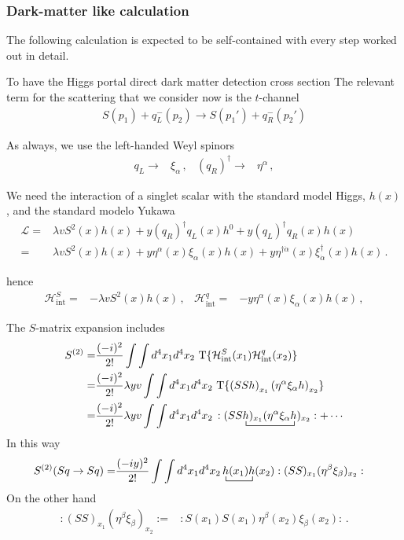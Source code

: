 \subsubsection{Dark-matter like calculation}

The following calculation is expected to be self-contained with every step worked out in detail.

To have the Higgs portal direct dark matter detection cross section
The relevant term for the scattering that we consider now is the $t$-channel
\begin{align}
  S(p_1)+q_L^{-}(p_2)\to  S(p_1')+q_R^{-}(p_2')
\end{align}

As always, we use the left-handed Weyl spinors
\begin{align}
  q_L\to &\xi_{\alpha}\,, &   \left( q_R \right)^{\dagger}\to &\eta^{\alpha}\,,
\end{align}


We need the interaction of a singlet scalar with the standard model Higgs, $h(x)$, and the standard modelo Yukawa
\begin{align}
  \mathcal{L}=&\lambda v S^2(x) h(x)+y \left(q_R\right)^{\dagger} q_L(x) h^0 +y \left(q_L\right)^{\dagger} q_R(x) h(x) \nonumber\\
  =&\lambda v S^2(x) h(x)+y \eta^{\alpha} (x)\xi_{\alpha}(x)h(x) + y \eta^{\dagger\dot{\alpha}}(x) \xi_{\dot{\alpha}}^{\dagger}(x)h(x)\,. 
\end{align}

hence
\begin{align}
  \mathcal{H}_{\text{int}}^{S}=&-\lambda v S^2(x) h(x)\,, &
   \mathcal{H}_{\text{int}}^{q}=&-y \eta^{\alpha} (x)\xi_{\alpha}(x)h(x)\,,
\end{align}

The $S$-matrix expansion includes
\begin{align}
S^{(2)}=&  \frac{(-i)^2}{2!}\int\int d^4x_1 d^4x_2\,\operatorname{T}\{\mathcal{H}_{\text{int}}^S(x_1)\mathcal{H}_{\text{int}}^q(x_2)\}\nonumber\\
=&  \frac{(-i)^2}{2!}\lambda y v\int\int d^4x_1 d^4x_2\,\operatorname{T}\{\left(S S h \right)_{x_1} \left( \eta^{\alpha} \xi_{\alpha}h \right)_{x_2}\}\nonumber\\
=& 
 \frac{(-i)^2}{2!}\lambda y v\int\int d^4x_1 d^4x_2\,:( S
\bcontraction{S}{h}{)_{x_1}(\eta^{\alpha} \xi_{\alpha}}{h}
S h)_{x_1}(\eta^{\alpha} \xi_{\alpha}h
)_{x_2}:+\cdots
\end{align}
In this way
\begin{align}
  S^{(2)}(S q\to S q)=&\frac{(-iy)^2}{2!}\int\int d^4x_1 d^4x_2
\bcontraction{\,}{h}{(x_1)}{h}
\,h(x_1)h(x_2):(SS)_{x_1}(\eta^{\beta} \xi_{\beta})_{x_2}:
\end{align}
On the other hand 
\begin{align}
\label{eq:ss156f}
  :(SS)_{x_1}(\eta^{\beta} \xi_{\beta})_{x_2}:=&
:S(x_1) S(x_1) \eta^{\beta}(x_2) \xi_{\beta}(x_2):\,.
\end{align}



